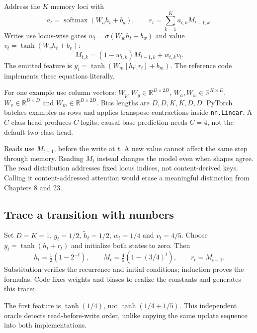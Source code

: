 Address the $K$ memory loci with
\[
a_t=\operatorname{softmax}(W_ah_t+b_a),\qquad
r_t=\sum_{k=1}^K a_{t,k}M_{t-1,k}.
\]
Writes use locus-wise gates $w_t=\sigma(W_wh_t+b_w)$ and value
$v_t=\tanh(W_vh_t+b_v)$:
\begin{equation}
M_{t,k}=(1-w_{t,k})M_{t-1,k}+w_{t,k}v_t.
\label{evod22:memory}
\end{equation}
The emitted feature is
$y_t=\tanh(W_m[h_t;r_t]+b_m)$. The reference code implements these equations
literally.

For one example use column vectors:
$W_p,W_g\in\mathbb R^{D\times2D}$,
$W_a,W_w\in\mathbb R^{K\times D}$,
$W_v\in\mathbb R^{D\times D}$ and
$W_m\in\mathbb R^{D\times2D}$. Bias lengths are $D,D,K,K,D,D$.
PyTorch batches examples as rows and applies transpose contractions inside
\texttt{nn.Linear}. A $C$-class head produces $C$ logits; causal base prediction
needs $C=4$, not the default two-class head.


Reads use $M_{t-1}$, before the write at $t$. A new value cannot affect the
same step through memory. Reading $M_t$ instead changes the model even when
shapes agree. The read distribution addresses fixed locus indices, not
content-derived keys. Calling it content-addressed attention would erase a
meaningful distinction from Chapters 8 and 23.

\subsection{Trace a transition with numbers}

Set $D=K=1$, $g_t=1/2$, $\tilde h_t=1/2$, $w_t=1/4$ and $v_t=4/5$.
Choose $y_t=\tanh(h_t+r_t)$ and initialize both states to zero. Then
\begin{equation}
 h_t=\tfrac12(1-2^{-t}),\qquad
 M_t=\tfrac45(1-(3/4)^t),\qquad r_t=M_{t-1}.
 \label{evod22:trace}
\end{equation}
Substitution verifies the recurrence and initial conditions; induction proves
the formulas. Code fixes weights and biases to realize the constants and
generates this trace:
\begin{center}\end{center}
The first feature is $\tanh(1/4)$, not $\tanh(1/4+1/5)$. This independent
oracle detects read-before-write order, unlike copying the same update sequence
into both implementations.


